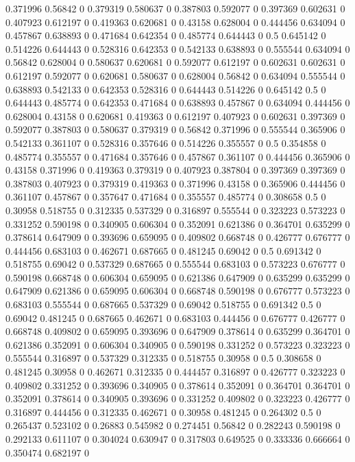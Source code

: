 0.371996 0.56842 0
0.379319 0.580637 0
0.387803 0.592077 0
0.397369 0.602631 0
0.407923 0.612197 0
0.419363 0.620681 0
0.43158 0.628004 0
0.444456 0.634094 0
0.457867 0.638893 0
0.471684 0.642354 0
0.485774 0.644443 0
0.5 0.645142 0
0.514226 0.644443 0
0.528316 0.642353 0
0.542133 0.638893 0
0.555544 0.634094 0
0.56842 0.628004 0
0.580637 0.620681 0
0.592077 0.612197 0
0.602631 0.602631 0
0.612197 0.592077 0
0.620681 0.580637 0
0.628004 0.56842 0
0.634094 0.555544 0
0.638893 0.542133 0
0.642353 0.528316 0
0.644443 0.514226 0
0.645142 0.5 0
0.644443 0.485774 0
0.642353 0.471684 0
0.638893 0.457867 0
0.634094 0.444456 0
0.628004 0.43158 0
0.620681 0.419363 0
0.612197 0.407923 0
0.602631 0.397369 0
0.592077 0.387803 0
0.580637 0.379319 0
0.56842 0.371996 0
0.555544 0.365906 0
0.542133 0.361107 0
0.528316 0.357646 0
0.514226 0.355557 0
0.5 0.354858 0
0.485774 0.355557 0
0.471684 0.357646 0
0.457867 0.361107 0
0.444456 0.365906 0
0.43158 0.371996 0
0.419363 0.379319 0
0.407923 0.387804 0
0.397369 0.397369 0
0.387803 0.407923 0
0.379319 0.419363 0
0.371996 0.43158 0
0.365906 0.444456 0
0.361107 0.457867 0
0.357647 0.471684 0
0.355557 0.485774 0
0.308658 0.5 0
0.30958 0.518755 0
0.312335 0.537329 0
0.316897 0.555544 0
0.323223 0.573223 0
0.331252 0.590198 0
0.340905 0.606304 0
0.352091 0.621386 0
0.364701 0.635299 0
0.378614 0.647909 0
0.393696 0.659095 0
0.409802 0.668748 0
0.426777 0.676777 0
0.444456 0.683103 0
0.462671 0.687665 0
0.481245 0.69042 0
0.5 0.691342 0
0.518755 0.69042 0
0.537329 0.687665 0
0.555544 0.683103 0
0.573223 0.676777 0
0.590198 0.668748 0
0.606304 0.659095 0
0.621386 0.647909 0
0.635299 0.635299 0
0.647909 0.621386 0
0.659095 0.606304 0
0.668748 0.590198 0
0.676777 0.573223 0
0.683103 0.555544 0
0.687665 0.537329 0
0.69042 0.518755 0
0.691342 0.5 0
0.69042 0.481245 0
0.687665 0.462671 0
0.683103 0.444456 0
0.676777 0.426777 0
0.668748 0.409802 0
0.659095 0.393696 0
0.647909 0.378614 0
0.635299 0.364701 0
0.621386 0.352091 0
0.606304 0.340905 0
0.590198 0.331252 0
0.573223 0.323223 0
0.555544 0.316897 0
0.537329 0.312335 0
0.518755 0.30958 0
0.5 0.308658 0
0.481245 0.30958 0
0.462671 0.312335 0
0.444457 0.316897 0
0.426777 0.323223 0
0.409802 0.331252 0
0.393696 0.340905 0
0.378614 0.352091 0
0.364701 0.364701 0
0.352091 0.378614 0
0.340905 0.393696 0
0.331252 0.409802 0
0.323223 0.426777 0
0.316897 0.444456 0
0.312335 0.462671 0
0.30958 0.481245 0
0.264302 0.5 0
0.265437 0.523102 0
0.26883 0.545982 0
0.274451 0.56842 0
0.282243 0.590198 0
0.292133 0.611107 0
0.304024 0.630947 0
0.317803 0.649525 0
0.333336 0.666664 0
0.350474 0.682197 0
